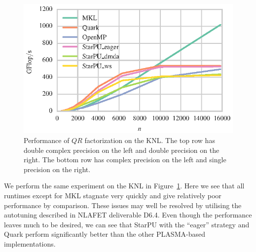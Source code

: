 \documentclass[a4paper,12pt]{article}
\begin{document}
\begin{figure}[t]
  \includegraphics[scale=.85]{fig/knl_ram_sgeqrf_weak_scaling.eps}
  \caption{Performance of $QR$ factorization on the KNL.
    The top row has double complex precision on the left and double
    precision on the right.
    The bottom row has complex precision on the left and single
    precision on the right.}
  \label{fig.qr_knl_ram}
\end{figure}

We perform the same experiment on the KNL in
Figure~\ref{fig.qr_knl_ram}.
Here we see that all runtimes except for MKL stagnate very quickly
and give relatively poor performance by comparison.
These issues may well be resolved by utilising the
autotuning described in NLAFET deliverable D6.4.
Even though the performance leaves much to be desired,
we can see that StarPU with the ``eager'' strategy
and Quark perform significantly better than the
other PLASMA-based implementations.

\end{document}
